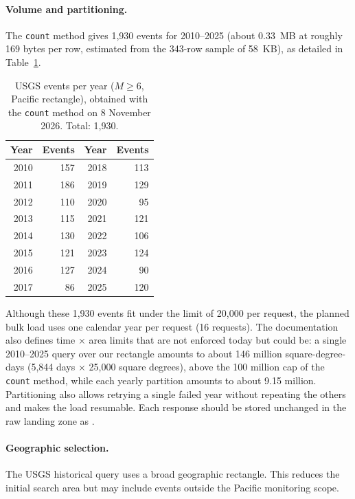 \documentclass[a4paper,11pt,oneside]{book}
\begin{document}
\paragraph{Volume and partitioning.}
The \texttt{count} method gives 1,930 events for 2010--2025 (about 0.33~MB at roughly 169 bytes per row, estimated from the 343-row sample of 58~KB), as detailed in Table~\ref{tab:usgs-counts}.

\begin{table}[H]
\centering
\small
\begin{tabular}{rrrr}
\toprule
Year & Events & Year & Events \\
\midrule
2010 & 157 & 2018 & 113 \\
2011 & 186 & 2019 & 129 \\
2012 & 110 & 2020 & 95 \\
2013 & 115 & 2021 & 121 \\
2014 & 130 & 2022 & 106 \\
2015 & 121 & 2023 & 124 \\
2016 & 127 & 2024 & 90 \\
2017 & 86 & 2025 & 120 \\
\bottomrule
\end{tabular}
\caption{USGS events per year ($M \geq 6$, Pacific rectangle), obtained with the \texttt{count} method on 8 November 2026. Total: 1,930.}
\label{tab:usgs-counts}
\end{table}

Although these 1,930 events fit under the limit of 20,000 per request, the planned bulk load uses one calendar year per request (16 requests).
The documentation also defines time $\times$ area limits that are not enforced today but could be: a single 2010--2025 query over our rectangle amounts to about 146 million square-degree-days (5,844 days $\times$ 25,000 square degrees), above the 100 million cap of the \texttt{count} method, while each yearly partition amounts to about 9.15 million.
Partitioning also allows retrying a single failed year without repeating the others and makes the load resumable.
Each response should be stored unchanged in the raw landing zone as .

\paragraph{Geographic selection.}

The USGS historical query uses a broad geographic rectangle.
This reduces the initial search area but may include events
outside the Pacific monitoring scope.
\end{document}
